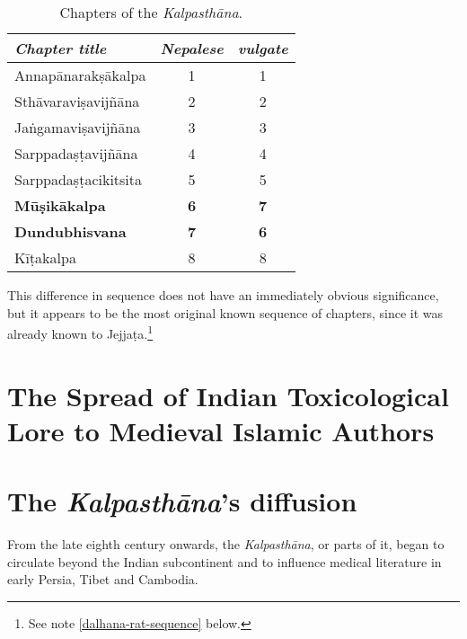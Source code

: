%
\begin{table}
    \centering\large
    \caption{Chapters of the \emph{Kalpasthāna}.}
    \medskip
    
\begin{tabular}{l c c}
   
    \emph{Chapter title} & \emph{Nepalese} & \emph{vulgate} \\
    \toprule
    Annapānarakṣākalpa & 1 & 1 \\
    Sthāvaraviṣavijñāna & 2 & 2 \\
    Jaṅgamaviṣavijñāna & 3 & 3 \\
    Sarppadaṣṭavijñāna & 4 & 4 \\
    Sarppadaṣṭacikitsita & 5 & 5 \\
    \textbf{Mūṣikākalpa} & \textbf{6} & \textbf{7} \\
    \textbf{Dundubhisvana} & \textbf{7} & \textbf{6} \\
    Kīṭakalpa & 8 & 8 \\
    \bottomrule
\end{tabular}
\label{kalpa-chapters}
\end{table}
%
%
\noindent
This difference in sequence does not have an immediately obvious 
significance, but it appears to be the most original known sequence of 
chapters, since it was already known to Jejjaṭa.\footnote{See note 
\ref{dalhana-rat-sequence} below.}

\section{The Spread of Indian Toxicological Lore to Medieval Islamic  
Authors}

\section{The \emph{Kalpasthāna}'s diffusion}

From the late eighth century onwards, the \emph{Kalpasthāna}, or parts
of it, began to circulate beyond the Indian subcontinent and to
influence medical literature in early Persia, Tibet and Cambodia.

